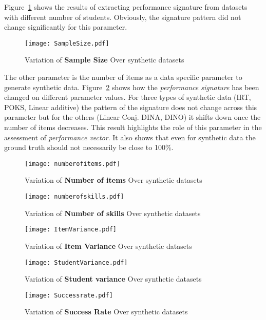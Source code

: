 Figure~\ref{figSampleSize} shows the results of extracting performance signature from datasets with different number of students. Obviously, the signature pattern did not change significantly for this parameter. 

\begin{figure}
  \centering

    \texttt{[image: SampleSize.pdf]}
     \caption{Variation of \textbf{Sample Size} Over synthetic datasets}
\label{figSampleSize}
\end{figure}


The other parameter is the number of items as a data specific parameter to generate synthetic data. Figure~\ref{figNumberofItems} shows how the \textit{performance signature} has been changed on different parameter values. For three types of synthetic data (IRT, POKS, Linear additive) the pattern of the signature does not change across this parameter but for the others (Linear Conj. DINA, DINO) it shifts down once the number of items decreases. This result highlights the role of this parameter in the assessment of \textit{performance vector}. It also shows that even for synthetic data the ground truth should not necessarily be close to 100\%.

\begin{figure}
  \centering
    \texttt{[image: numberofitems.pdf]}
\caption{Variation of \textbf{Number of items} Over synthetic datasets}
\label{figNumberofItems}
\end{figure}

\begin{figure}
  \centering
    \texttt{[image: numberofskills.pdf]}
\caption{Variation of \textbf{Number of skills} Over synthetic datasets}
\label{figSkills}
\end{figure}

\begin{figure}
  \centering
    \texttt{[image: ItemVariance.pdf]}
\caption{Variation of \textbf{Item Variance} Over synthetic datasets}
\label{figitemVar}
\end{figure}

\begin{figure}
  \centering
    \texttt{[image: StudentVariance.pdf]}
\caption{Variation of \textbf{Student variance} Over synthetic datasets}
\label{figStudentVar}
\end{figure}


\begin{figure}
  \centering
    \texttt{[image: Successrate.pdf]}
\caption{Variation of \textbf{Success Rate} Over synthetic datasets}
\label{figSucceessRate}
\end{figure}

